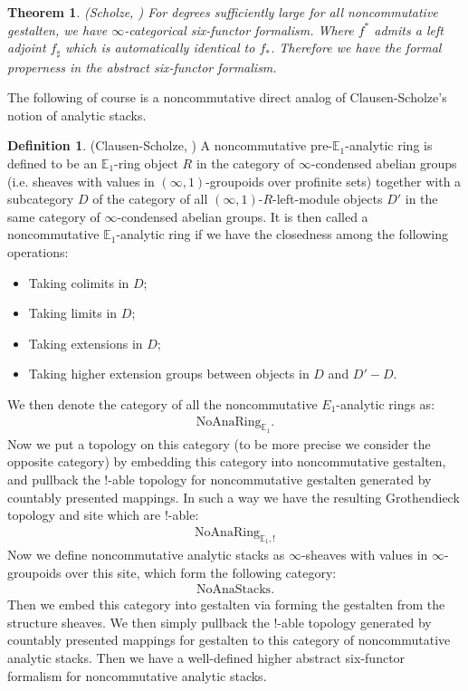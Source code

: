 \documentclass[12pt]{article}
\newtheorem{theorem}{Theorem}
\theoremstyle{definition}
\newtheorem{definition}{Definition}
\begin{document}
\begin{theorem}\mbox(Scholze, \cite[Theorem 5.2]{5S5})
For degrees sufficiently large for all noncommutative gestalten, we have $\infty$-categorical six-functor formalism. Where $f^*$ admits a left adjoint $f_\sharp$ which is automatically identical to $f_*$. Therefore we have the formal properness in the abstract six-functor formalism.
\end{theorem}

\noindent The following of course is a noncommutative direct analog of Clausen-Scholze's notion of analytic stacks. 

\begin{definition} (Clausen-Scholze, \cite{CS1})
A noncommutative pre-$\mathbb{E}_1$-analytic ring is defined to be an $\mathbb{E}_1$-ring object $R$ in the category of $\infty$-condensed abelian groups (i.e. sheaves with values in $(\infty,1)$-groupoids over profinite sets) together with a subcategory $D$ of the category of all $(\infty,1)$-$R$-left-module objects $D'$ in the same category of $\infty$-condensed abelian groups. It is then called a noncommutative $\mathbb{E}_1$-analytic ring if we have the closedness  among the following operations:
\begin{itemize}\setlength{\itemsep}{-0.1cm}
\item[1] Taking colimits in $D$;
\item[2] Taking limits in $D$;
\item[3] Taking extensions in $D$;
\item[4] Taking higher extension groups between objects in $D$ and $D'-D$.
\end{itemize}
We then denote the category of all the noncommutative $E_1$-analytic rings as:
\begin{align}
\mathrm{NoAnaRing}_{\mathbb{E}_1}.
\end{align}
Now we put a topology on this category (to be more precise we consider the opposite category) by embedding this category into noncommutative gestalten, and pullback the $!$-able topology for noncommutative gestalten generated by countably presented mappings. In such a way we have the resulting Grothendieck topology and site which are $!$-able:
\begin{align}
\mathrm{NoAnaRing}_{\mathbb{E}_1,!}
\end{align}
Now we define noncommutative analytic stacks as $\infty$-sheaves with values in $\infty$-groupoids over this site, which form the following category:
\begin{align}
\mathrm{NoAnaStacks}.
\end{align}
Then we embed this category into gestalten via forming the gestalten from the structure sheaves. We then simply pullback the $!$-able topology generated by countably presented mappings for gestalten to this category of noncommutative analytic stacks. Then we have a well-defined higher abstract six-functor formalism for noncommutative analytic stacks.
\end{definition}
\end{document}
